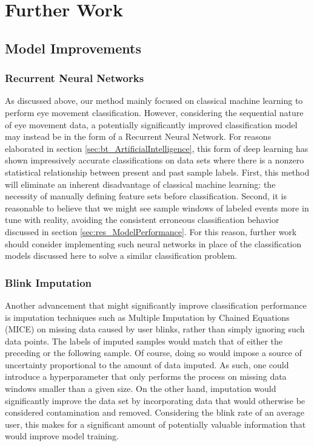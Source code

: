 \section{Further Work}

\subsection{Model Improvements}

\subsubsection{Recurrent Neural Networks}

As discussed above, our method mainly focused on classical machine learning to perform eye movement classification. However, considering the sequential nature of eye movement data, a potentially significantly improved classification model may instead be in the form of a Recurrent Neural Network. For reasons elaborated in section \ref{sec:bt_ArtificialIntelligence}, this form of deep learning has shown impressively accurate classifications on data sets where there is a nonzero statistical relationship between present and past sample labels. First, this method will eliminate an inherent disadvantage of classical machine learning: the necessity of manually defining feature sets before classification. Second, it is reasonable to believe that we might see sample windows of labeled events more in tune with reality, avoiding the consistent erroneous classification behavior discussed in section \ref{sec:res_ModelPerformance}. For this reason, further work should consider implementing such neural networks in place of the classification models discussed here to solve a similar classification problem.

\subsubsection{Blink Imputation}

Another advancement that might significantly improve classification performance is imputation techniques such as Multiple Imputation by Chained Equations (MICE) on missing data caused by user blinks, rather than simply ignoring such data points. The labels of imputed samples would match that of either the preceding or the following sample. Of course, doing so would impose a source of uncertainty proportional to the amount of data imputed. As such, one could introduce a hyperparameter that only performs the process on missing data windows smaller than a given size. On the other hand, imputation would significantly improve the data set by incorporating data that would otherwise be considered contamination and removed. Considering the blink rate of an average user, this makes for a significant amount of potentially valuable information that would improve model training. 

